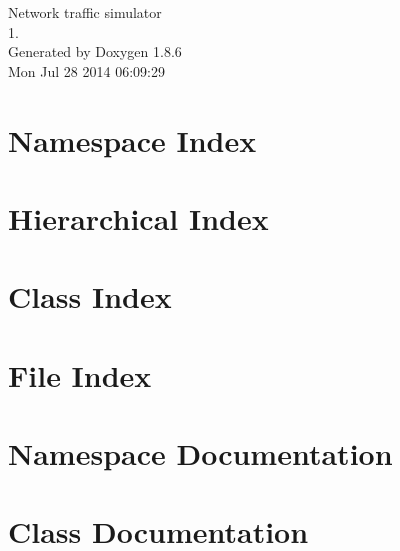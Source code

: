 \documentclass[twoside]{book}
\newcommand{\clearemptydoublepage}{%
  \newpage{\pagestyle{empty}\cleardoublepage}%
}
\begin{document}
\hypersetup{pageanchor=false}
\begin{titlepage}
\vspace*{7cm}
\begin{center}%
{\Large Network traffic simulator \\[1ex]\large 1. }\\
\vspace*{1cm}
{\large Generated by Doxygen 1.8.6}\\
\vspace*{0.5cm}
{\small Mon Jul 28 2014 06:09:29}\\
\end{center}
\end{titlepage}
\clearemptydoublepage
\tableofcontents
\clearemptydoublepage
{}
\hypersetup{pageanchor=true}

\chapter{Namespace Index}

\chapter{Hierarchical Index}

\chapter{Class Index}

\chapter{File Index}

\chapter{Namespace Documentation}



\chapter{Class Documentation}






















\end{document}
